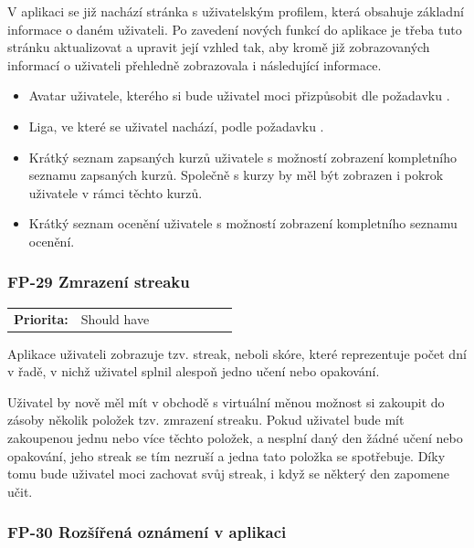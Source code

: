 V aplikaci se již nachází stránka s uživatelským profilem, která obsahuje základní informace o daném uživateli. Po zavedení nových funkcí do aplikace je třeba tuto stránku aktualizovat  a upravit její vzhled tak, aby kromě již zobrazovaných informací o uživateli přehledně zobrazovala i následující informace.

\begin{itemize}
    \item Avatar uživatele, kterého si bude uživatel moci přizpůsobit dle požadavku .
    \item Liga, ve které se uživatel nachází, podle požadavku .
    \item Krátký seznam zapsaných kurzů uživatele s možností zobrazení kompletního seznamu zapsaných kurzů. Společně s kurzy by měl být zobrazen i pokrok uživatele v rámci těchto kurzů.
    \item Krátký seznam ocenění uživatele s možností zobrazení kompletního seznamu ocenění.
\end{itemize}

\subsubsection{FP-29 Zmrazení streaku}\label{sec:fp-streak-freeze}

\begin{tabular}{lp{0.7\linewidth}}
    \textbf{Priorita:} & Should have \\
\end{tabular}

Aplikace uživateli zobrazuje tzv. streak, neboli skóre, které reprezentuje počet dní v řadě, v nichž uživatel splnil alespoň jedno učení nebo opakování.

Uživatel by nově měl mít v obchodě s virtuální měnou možnost si zakoupit do zásoby několik položek tzv. zmrazení streaku. Pokud uživatel bude mít zakoupenou jednu nebo více těchto položek, a nesplní daný den žádné učení nebo opakování, jeho streak se tím nezruší a jedna tato položka se spotřebuje. Díky tomu bude uživatel moci zachovat svůj streak, i když se některý den zapomene učit.

\subsubsection{FP-30 Rozšířená oznámení v aplikaci}\label{sec:fp-extended-notifications} 

